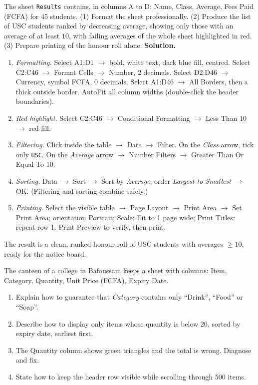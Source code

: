 \documentclass[11pt]{article}
\begin{document}
\begin{exoresolu}
The sheet \texttt{Results} contains, in columns A to D: Name, Class, Average, Fees Paid (FCFA) for 45 students. (1) Format the sheet professionally. (2) Produce the list of USC students ranked by decreasing average, showing only those with an average of at least $10$, with failing averages of the whole sheet highlighted in red. (3) Prepare printing of the honour roll alone.
\tcblower
\textbf{Solution.}
\begin{enumerate}
\item \emph{Formatting.} Select A1:D1 $\rightarrow$ bold, white text, dark blue fill, centred. Select C2:C46 $\rightarrow$ Format Cells $\rightarrow$ Number, 2 decimals. Select D2:D46 $\rightarrow$ Currency, symbol FCFA, 0 decimals. Select A1:D46 $\rightarrow$ All Borders, then a thick outside border. AutoFit all column widths (double-click the header boundaries).
\item \emph{Red highlight.} Select C2:C46 $\rightarrow$ Conditional Formatting $\rightarrow$ Less Than $10$ $\rightarrow$ red fill.
\item \emph{Filtering.} Click inside the table $\rightarrow$ Data $\rightarrow$ Filter. On the \emph{Class} arrow, tick only \texttt{USC}. On the \emph{Average} arrow $\rightarrow$ Number Filters $\rightarrow$ Greater Than Or Equal To $10$.
\item \emph{Sorting.} Data $\rightarrow$ Sort $\rightarrow$ Sort by \emph{Average}, order \emph{Largest to Smallest} $\rightarrow$ OK. (Filtering and sorting combine safely.)
\item \emph{Printing.} Select the visible table $\rightarrow$ Page Layout $\rightarrow$ Print Area $\rightarrow$ Set Print Area; orientation Portrait; Scale: Fit to 1 page wide; Print Titles: repeat row 1. Print Preview to verify, then print.
\end{enumerate}
The result is a clean, ranked honour roll of USC students with averages $\geq 10$, ready for the notice board.
\end{exoresolu}

\begin{exercice}
The canteen of a college in Bafoussam keeps a sheet with columns: Item, Category, Quantity, Unit Price (FCFA), Expiry Date.
\begin{enumerate}
\item Explain how to guarantee that \emph{Category} contains only ``Drink'', ``Food'' or ``Soap''.
\item Describe how to display only items whose quantity is below 20, sorted by expiry date, earliest first.
\item The Quantity column shows green triangles and the total is wrong. Diagnose and fix.
\item State how to keep the header row visible while scrolling through 500 items.
\end{enumerate}
\end{exercice}
\end{document}

